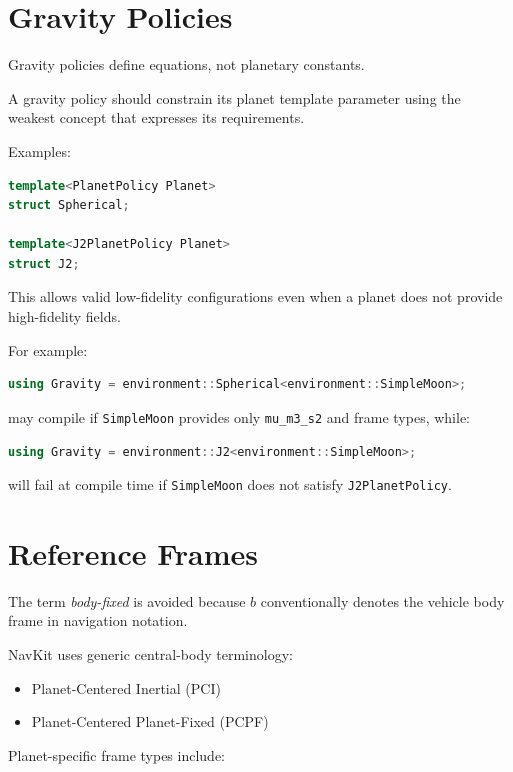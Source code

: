 \documentclass[11pt]{article}
\begin{document}
\section{Gravity Policies}

Gravity policies define equations, not planetary constants.

A gravity policy should constrain its planet template parameter using the
weakest concept that expresses its requirements.

Examples:

\begin{lstlisting}[language=C++]
template<PlanetPolicy Planet>
struct Spherical;

template<J2PlanetPolicy Planet>
struct J2;
\end{lstlisting}

This allows valid low-fidelity configurations even when a planet does not
provide high-fidelity fields.

For example:

\begin{lstlisting}[language=C++]
using Gravity = environment::Spherical<environment::SimpleMoon>;
\end{lstlisting}

may compile if \texttt{SimpleMoon} provides only \texttt{mu\_m3\_s2} and frame
types, while:

\begin{lstlisting}[language=C++]
using Gravity = environment::J2<environment::SimpleMoon>;
\end{lstlisting}

will fail at compile time if \texttt{SimpleMoon} does not satisfy
\texttt{J2PlanetPolicy}.

\section{Reference Frames}

The term \emph{body-fixed} is avoided because \(b\) conventionally denotes the
vehicle body frame in navigation notation.

NavKit uses generic central-body terminology:

\begin{itemize}
    \item Planet-Centered Inertial (PCI)
    \item Planet-Centered Planet-Fixed (PCPF)
\end{itemize}

Planet-specific frame types include:
\end{document}
